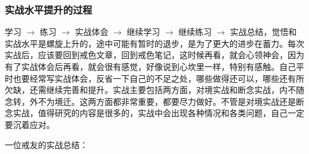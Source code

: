\subsubsection{实战水平提升的过程}

学习 $\to$ 练习 $\to$ 实战体会 $\to$ 继续学习 $\to$ 继续练习 $\to$ 实战总结，觉悟和实战水平是螺旋上升的，途中可能有暂时的退步，是为了更大的进步在蓄力。每次实战后，应该要回到戒色文章，回到戒色笔记，这时候再看，就会心领神会，因为有了实战体会后再看，就会很有感觉，好像说到心坎里一样，特别有感触。自己平时也要经常写实战体会，反省一下自己的不足之处，哪些做得还可以，哪些还有所欠缺，还需继续完善和提升。实战主要包括两方面，对境实战和断念实战，内不随念转，外不为境迁。这两方面都非常重要，都要尽力做好。不管是对境实战还是断念实战，值得研究的内容是很多的，实战中会出现各种情况和各类问题，自己一定要沉着应对。

一位戒友的实战总结：

